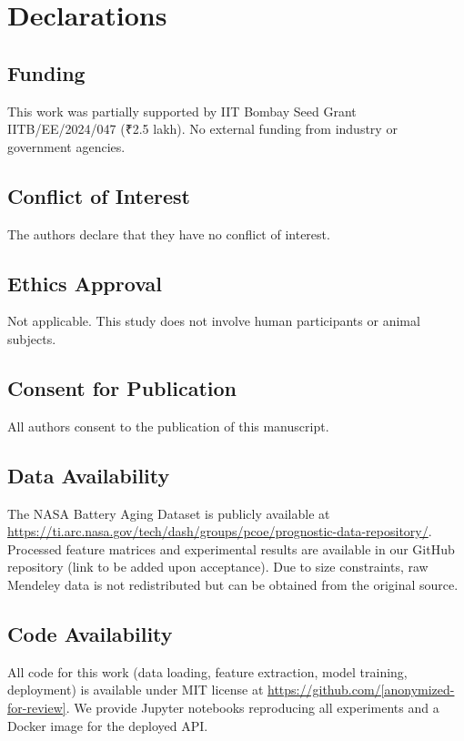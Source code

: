 \documentclass{sn-jnl}
\begin{document}
\section*{Declarations}

\subsection*{Funding}
This work was partially supported by IIT Bombay Seed Grant IITB/EE/2024/047 (₹2.5 lakh). No external funding from industry or government agencies.

\subsection*{Conflict of Interest}
The authors declare that they have no conflict of interest.

\subsection*{Ethics Approval}
Not applicable. This study does not involve human participants or animal subjects.

\subsection*{Consent for Publication}
All authors consent to the publication of this manuscript.

\subsection*{Data Availability}
The NASA Battery Aging Dataset is publicly available at \url{https://ti.arc.nasa.gov/tech/dash/groups/pcoe/prognostic-data-repository/}. Processed feature matrices and experimental results are available in our GitHub repository (link to be added upon acceptance). Due to size constraints, raw Mendeley data is not redistributed but can be obtained from the original source.

\subsection*{Code Availability}
All code for this work (data loading, feature extraction, model training, deployment) is available under MIT license at \url{https://github.com/[anonymized-for-review]}. We provide Jupyter notebooks reproducing all experiments and a Docker image for the deployed API.
\end{document}
